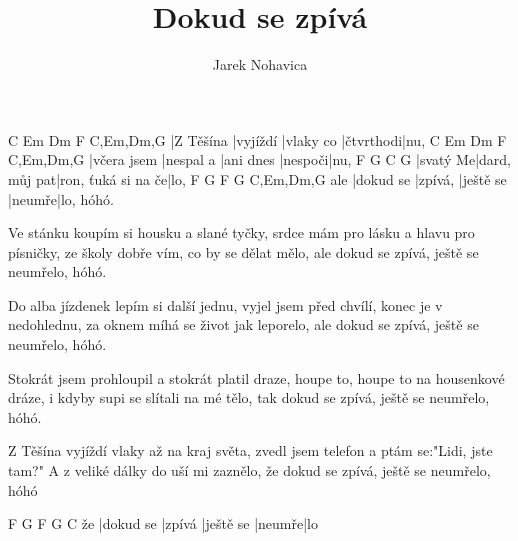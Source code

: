 \documentclass{song}
\title{Dokud se zpívá}
\author{Jarek Nohavica}
\begin{document}
\strophe
C         Em       Dm        F         C,Em,Dm,G
|Z Těšína |vyjíždí |vlaky co |čtvrthodi|nu,
C           Em        Dm        F       C,Em,Dm,G
|včera jsem |nespal a |ani dnes |nespoči|nu,
F        G             C                  G
|svatý Me|dard, můj pat|ron, ťuká si na če|lo,
    F         G       F         G      C,Em,Dm,G
ale |dokud se |zpívá, |ještě se |neumře|lo, hóhó.
\endstrophe

\strophe*
Ve stánku koupím si housku a slané tyčky,
srdce mám pro lásku a hlavu pro písničky,
ze školy dobře vím, co by se dělat mělo,
ale dokud se zpívá, ještě se neumřelo, hóhó.
\endstrophe

\strophe*
Do alba jízdenek lepím si další jednu,
vyjel jsem před chvílí, konec je v nedohlednu,
za oknem míhá se život jak leporelo,
ale dokud se zpívá, ještě se neumřelo, hóhó.
\endstrophe

\strophe*
Stokrát jsem prohloupil a stokrát platil draze,
houpe to, houpe to na housenkové dráze,
i kdyby supi se slítali na mé tělo,
tak dokud se zpívá, ještě se neumřelo, hóhó.
\endstrophe

\strophe*
Z Těšína vyjíždí vlaky až na kraj světa,
zvedl jsem telefon a ptám se:"Lidi, jste tam?"
A z veliké dálky do uší mi zaznělo,
že dokud se zpívá, ještě se neumřelo, hóhó
\endstrophe

\strophe
   F         G      F         G      C
že |dokud se |zpívá |ještě se |neumře|lo
\endstrophe
\end{document}
